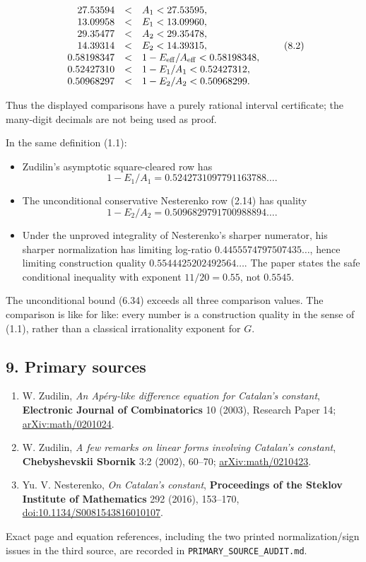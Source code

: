 \documentclass[
  11pt,
]{article}
\providecommand{\tightlist}{%
  \setlength{\itemsep}{0pt}\setlength{\parskip}{0pt}}
\begin{document}
\[
\begin{array}{rcl}
27.53594&<&A_1<27.53595,\\
13.09958&<&E_1<13.09960,\\
29.35477&<&A_2<29.35478,\\
14.39314&<&E_2<14.39315,\\
0.58198347&<&1-E_{\rm eff}/A_{\rm eff}<0.58198348,\\
0.52427310&<&1-E_1/A_1<0.52427312,\\
0.50968297&<&1-E_2/A_2<0.50968299.
\end{array}                                          \tag{8.2}
\]

Thus the displayed comparisons have a purely rational interval
certificate; the many-digit decimals are not being used as proof.

In the same definition (1.1):

\begin{itemize}
\tightlist
\item
  Zudilin's asymptotic square-cleared row has \[
  1-E_1/A_1=0.5242731097791163788\ldots.
  \]
\item
  The unconditional conservative Nesterenko row (2.14) has quality \[
  1-E_2/A_2=0.5096829791700988894\ldots.
  \]
\item
  Under the unproved integrality of Nesterenko's sharper numerator, his
  sharper normalization has limiting log-ratio
  \(0.4455574797507435\ldots\), hence limiting construction quality
  \(0.5544425202492564\ldots\). The paper states the safe conditional
  inequality with exponent \(11/20=0.55\), not \(0.5545\).
\end{itemize}

The unconditional bound (6.34) exceeds all three comparison values. The
comparison is like for like: every number is a construction quality in
the sense of (1.1), rather than a classical irrationality exponent for
\(G\).

\hypertarget{primary-sources}{%
\subsection{9. Primary sources}\label{primary-sources}}

\begin{enumerate}
\def\labelenumi{\arabic{enumi}.}
\tightlist
\item
  W. Zudilin, \emph{An Apéry-like difference equation for Catalan's
  constant}, \textbf{Electronic Journal of Combinatorics} 10 (2003),
  Research Paper 14;
  \href{https://arxiv.org/abs/math/0201024}{arXiv:math/0201024}.
\item
  W. Zudilin, \emph{A few remarks on linear forms involving Catalan's
  constant}, \textbf{Chebyshevskii Sbornik} 3:2 (2002), 60--70;
  \href{https://arxiv.org/abs/math/0210423}{arXiv:math/0210423}.
\item
  Yu. V. Nesterenko, \emph{On Catalan's constant}, \textbf{Proceedings
  of the Steklov Institute of Mathematics} 292 (2016), 153--170,
  \href{https://doi.org/10.1134/S0081543816010107}{doi:10.1134/S0081543816010107}.
\end{enumerate}

Exact page and equation references, including the two printed
normalization/sign issues in the third source, are recorded in
\texttt{PRIMARY\_SOURCE\_AUDIT.md}.
\end{document}
